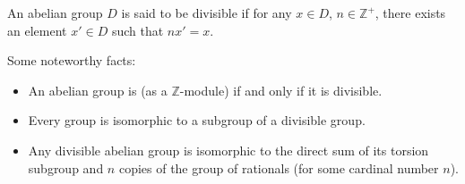 \documentclass[12pt]{article}
\newcommand{\mb}{\mathbb}
\newcommand{\Z}{\mb{Z}}
\newcommand{\<}{\langle}
\renewcommand{\>}{\rangle}
\begin{document}
An abelian group $D$ is said to be divisible if for any $x\in D$, $n\in\Z^+$, there exists an element $x'\in D$ such that $nx'=x$.  

Some noteworthy facts:
\begin{itemize}
\item An abelian group is  (as a $\Z$-module) if and only if it is divisible. 

\item Every group is isomorphic to a subgroup of a divisible group.

\item Any divisible abelian group is isomorphic to the direct sum of its torsion subgroup and $n$ copies of the group of rationals (for some cardinal number $n$).
\end{itemize}
\end{document}
